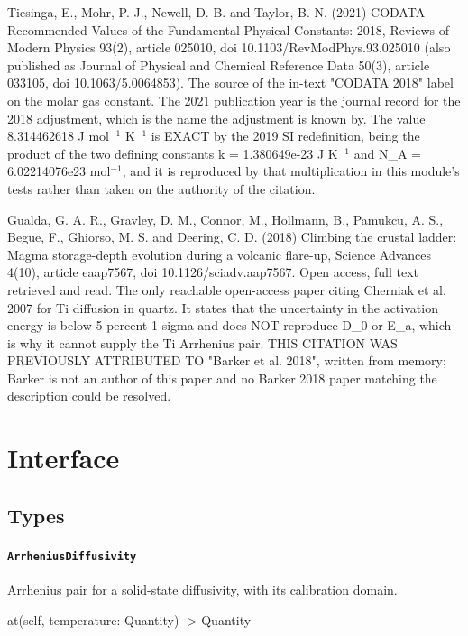 \documentclass[10pt,a4paper,twoside]{report}
\begin{document}
Tiesinga, E., Mohr, P. J., Newell, D. B. and Taylor, B. N. (2021) CODATA Recommended Values of the Fundamental Physical Constants: 2018, Reviews of Modern Physics 93(2), article 025010, doi 10.1103/RevModPhys.93.025010 (also published as Journal of Physical and Chemical Reference Data 50(3), article 033105, doi 10.1063/5.0064853). The source of the in-text "CODATA 2018" label on the molar gas constant. The 2021 publication year is the journal record for the 2018 adjustment, which is the name the adjustment is known by. The value 8.314462618 J mol$^{-1}$ K$^{-1}$ is EXACT by the 2019 SI redefinition, being the product of the two defining constants k = 1.380649e-23 J K$^{-1}$ and N\_A = 6.02214076e23 mol$^{-1}$, and it is reproduced by that multiplication in this module's tests rather than taken on the authority of the citation.

Gualda, G. A. R., Gravley, D. M., Connor, M., Hollmann, B., Pamukcu, A. S., Begue, F., Ghiorso, M. S. and Deering, C. D. (2018) Climbing the crustal ladder: Magma storage-depth evolution during a volcanic flare-up, Science Advances 4(10), article eaap7567, doi 10.1126/sciadv.aap7567. Open access, full text retrieved and read. The only reachable open-access paper citing Cherniak et al. 2007 for Ti diffusion in quartz. It states that the uncertainty in the activation energy is below 5 percent 1-sigma and does NOT reproduce D\_0 or E\_a, which is why it cannot supply the Ti Arrhenius pair. THIS CITATION WAS PREVIOUSLY ATTRIBUTED TO "Barker et al. 2018", written from memory; Barker is not an author of this paper and no Barker 2018 paper matching the description could be resolved.

\section{Interface}

\subsection*{Types}

\paragraph{\texttt{ArrheniusDiffusivity}}

Arrhenius pair for a solid-state diffusivity, with its calibration domain.

\begin{verbatimsmall}
at(self, temperature: Quantity) -> Quantity
\end{verbatimsmall}
\end{document}
